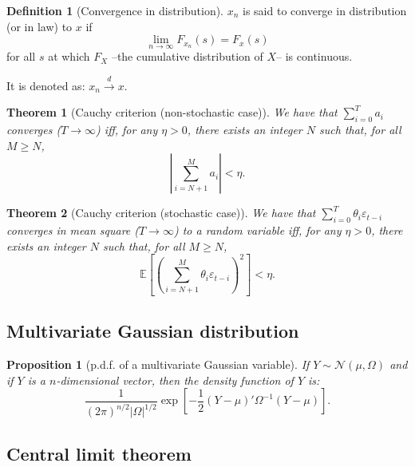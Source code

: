 \documentclass[
  12pt,
]{book}
\newtheorem{theorem}{Theorem}[chapter]
\newtheorem{proposition}{Proposition}[chapter]
\theoremstyle{definition}
\newtheorem{definition}{Definition}[chapter]
\theoremstyle{definition}
\theoremstyle{definition}
\theoremstyle{definition}
\theoremstyle{remark}
\begin{document}
\begin{definition}[Convergence in distribution]
\protect\hypertarget{def:cvgceDistri}{}\label{def:cvgceDistri}\(x_n\) is said to converge in distribution (or in law) to \(x\) if
\[
\lim_{n \rightarrow \infty} F_{x_n}(s) = F_{x}(s)
\]
for all \(s\) at which \(F_X\) --the cumulative distribution of \(X\)-- is continuous.

It is denoted as: \(x_n \overset{d}{\rightarrow} x\).
\end{definition}

\begin{theorem}[Cauchy criterion (non-stochastic case)]
\protect\hypertarget{thm:cauchycritstatic}{}\label{thm:cauchycritstatic}We have that \(\sum_{i=0}^{T} a_i\) converges (\(T \rightarrow \infty\)) iff, for any \(\eta > 0\), there exists an integer \(N\) such that, for all \(M\ge N\),
\[
\left|\sum_{i=N+1}^{M} a_i\right| < \eta.
\]
\end{theorem}

\begin{theorem}[Cauchy criterion (stochastic case)]
\protect\hypertarget{thm:cauchycritstochastic}{}\label{thm:cauchycritstochastic}We have that \(\sum_{i=0}^{T} \theta_i \varepsilon_{t-i}\) converges in mean square (\(T \rightarrow \infty\)) to a random variable iff, for any \(\eta > 0\), there exists an integer \(N\) such that, for all \(M\ge N\),
\[
\mathbb{E}\left[\left(\sum_{i=N+1}^{M} \theta_i \varepsilon_{t-i}\right)^2\right] < \eta.
\]
\end{theorem}

\hypertarget{multivariate-gaussian-distribution}{%
\subsection{Multivariate Gaussian distribution}\label{multivariate-gaussian-distribution}}

\begin{proposition}[p.d.f. of a multivariate Gaussian variable]
\protect\hypertarget{prp:pdfMultivarGaussian}{}\label{prp:pdfMultivarGaussian}If \(Y \sim \mathcal{N}(\mu,\Omega)\) and if \(Y\) is a \(n\)-dimensional vector, then the density function of \(Y\) is:
\[
\frac{1}{(2 \pi)^{n/2}|\Omega|^{1/2}}\exp\left[-\frac{1}{2}\left(Y-\mu\right)'\Omega^{-1}\left(Y-\mu\right)\right].
\]
\end{proposition}

\hypertarget{CLTappend}{%
\subsection{Central limit theorem}\label{CLTappend}}
\end{document}
